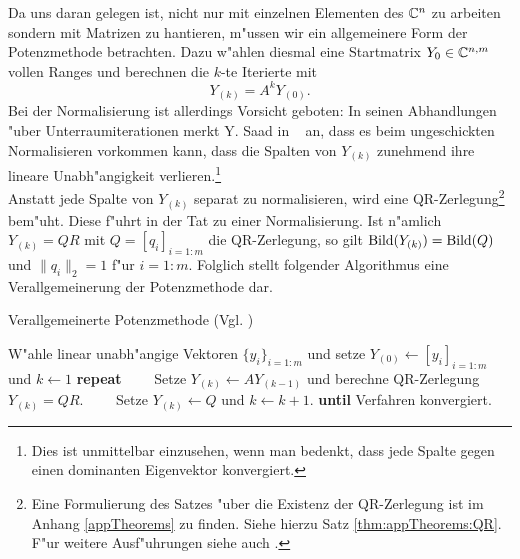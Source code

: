 
\newpage
Da uns daran gelegen ist, nicht nur mit einzelnen Elementen des $\mathbb{C}^n$ zu arbeiten sondern mit Matrizen zu hantieren, m"ussen wir ein allgemeinere Form der Potenzmethode betrachten. Dazu w"ahlen diesmal eine Startmatrix $Y_{0}\in\mathbb{C}^{n,m}$ vollen Ranges und berechnen die $k$-te Iterierte mit
\[
Y_{(k)} = A^k Y_{(0)}.
\]
Bei der Normalisierung ist allerdings Vorsicht geboten: In seinen Abhandlungen "uber Unterraumiterationen
merkt Y. Saad in ~\cite[Abschnitt 5.1]{saad} an,
dass es beim ungeschickten Normalisieren vorkommen kann, dass die Spalten von $Y_{(k)}$ zunehmend ihre lineare Unabh"angigkeit verlieren.\footnote{Dies ist unmittelbar einzusehen, wenn man bedenkt, dass jede Spalte gegen einen dominanten Eigenvektor konvergiert.}\\

Anstatt jede Spalte von $Y_{(k)}$ separat zu normalisieren, wird eine QR-Zerlegung\footnote{Eine Formulierung des Satzes "uber die Existenz der QR-Zerlegung ist im Anhang \ref{appTheorems} zu finden. Siehe hierzu Satz \ref{thm:appTheorems:QR}. F"ur weitere Ausf"uhrungen siehe auch \cite[S. 55 ff.]{stewart}.}
bem"uht. Diese f"uhrt in der Tat zu einer Normalisierung. Ist n"amlich $Y_{(k)} = QR$ mit
$Q = [q_i]_{i=1:m}$ die QR-Zerlegung, so gilt $\operatorname{Bild}(Y_{(k)}) = \operatorname{Bild}(Q)$ und $\|q_i\|_2 = 1$ f"ur $i=1:m$. Folglich stellt folgender Algorithmus eine Verallgemeinerung der Potenzmethode dar.

\begin{algorithm}
\caption{Verallgemeinerte Potenzmethode (Vgl. \cite[Algorithmus 5.1, 115]{saad})}\label{alg:chap4:potenzverfahrenMatrix}
\begin{algorithmic}[1]
\State W"ahle linear unabh"angige Vektoren $\{y_i\}_{i=1:m}$ und setze $Y_{(0)}\gets[y_i]_{i=1:m}$ und $k\gets 1$
\State \textbf{repeat}
\State \ \ \ \ Setze $Y_{(k)} \gets AY_{(k-1)}$ und berechne QR-Zerlegung $Y_{(k)} = QR$.
\State \ \ \ \ Setze $Y_{(k)} \gets Q$ und $k\gets k+1$.
\State \textbf{until} Verfahren konvergiert.
\end{algorithmic}
\end{algorithm}

